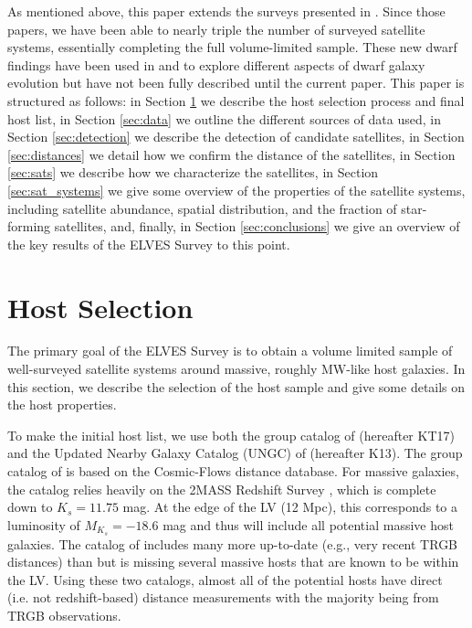 \documentclass[twocolumn]{aastex62}
\begin{document}
As mentioned above, this paper extends the surveys presented in \citet{carlsten2020a, carlsten2020c, carlsten2020b}. Since those papers, we have been able to nearly triple the number of surveyed satellite systems, essentially completing the full volume-limited sample. These new dwarf findings have been used in \citet{carlsten2021a} and \citet{carlsten2021b} to explore different aspects of dwarf galaxy evolution but have not been fully described until the current paper. This paper is structured as follows: in Section \ref{sec:hosts} we describe the host selection process and final host list, in Section \ref{sec:data} we outline the different sources of data used, in Section \ref{sec:detection} we describe the detection of candidate satellites, in Section \ref{sec:distances} we detail how we confirm the distance of the satellites, in Section \ref{sec:sats} we describe how we characterize the satellites,   in Section \ref{sec:sat_systems} we give some overview of the properties of the satellite systems, including satellite abundance, spatial distribution, and the fraction of star-forming satellites, and, finally, in Section \ref{sec:conclusions} we give an overview of the key results of the ELVES Survey to this point.







\section{Host Selection}
\label{sec:hosts}
The primary goal of the ELVES Survey is to obtain a volume limited sample of well-surveyed satellite systems around massive, roughly MW-like host galaxies. In this section, we describe the selection of the host sample and give some details on the host properties.

To make the initial host list, we use both the group catalog of \citet{kourkchi2017} (hereafter KT17) and the Updated Nearby Galaxy Catalog (UNGC) of \citet{karachentsev2004, karachentsev2013} (hereafter K13). The group catalog of  is based on the Cosmic-Flows \citep{tully2016} distance database.  For massive galaxies, the catalog relies heavily on the 2MASS Redshift Survey \citep{huchra2012}, which is complete down to $K_s=11.75$ mag. At the edge of the LV (12 Mpc), this corresponds to a luminosity of $M_{K_s}=-18.6$ mag and thus will include all potential massive host galaxies. The catalog of  includes many more up-to-date (e.g., very recent TRGB distances) than  but is missing several massive hosts that are known to be within the LV. Using these two catalogs, almost all of the potential hosts have direct (i.e. not redshift-based) distance measurements with the majority being from TRGB observations. 
\end{document}
